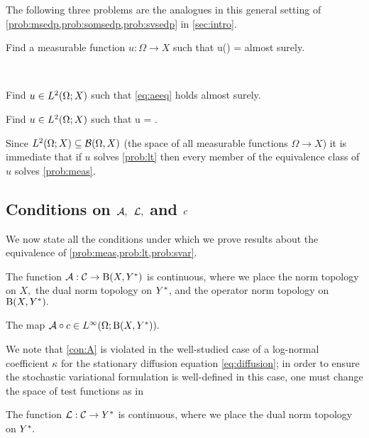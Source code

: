 The following three problems are the analogues in this general setting of \cref{prob:msedp,prob:somsedp,prob:svsedp} in \cref{sec:intro}.

\label{prob:meas}
Find a measurable function $u:\Omega \rightarrow X$ such that 
\beq\label{eq:aeeq}
\Acomega u(\omega) = \Lcomega \tin \Ys
\eeq
almost surely.
\eprobvar

\label{prob:lt}

\

Find $u \in \LtOX$ such that \eqref{eq:aeeq} holds almost surely.
\eprobvar

\label{prob:svar}
Find $u \in \LtOX$ such that
\beq\label{eq:stoeq}
\SAc u = \SLc \tin \LtOYas.
\eeq
\eprobvar

\label{rem:imm}
Since $\LtOX \subseteq \BorelOX$ (the space of all measurable functions $\Omega\rightarrow X$)
it is immediate that if $u$ solves \cref{prob:lt} then every member of the equivalence class of $u$ solves \cref{prob:meas}.
\ere

\subsection{Conditions on $\mathcal A,$ $\mathcal L,$ and $c$}\label{sec:cons}
We now state all the conditions under which we prove results about the equivalence of \cref{prob:meas,prob:lt,prob:svar}.


 \label{con:coeffstoform}
The function $\toform:\cC \rightarrow \homspace$ is continuous, where we place the norm topology on $X,$ the dual norm topology on $Y^{*}$, and the operator norm topology on $\homspace.$
\econvar

\label{con:A}
The map $\toform\circ\coeff \in \LiOhomspace.$
\econvar


We note that \cref{con:A} is violated in the well-studied case of a log-normal coefficient $\kappa$ for the stationary diffusion equation \eqref{eq:diffusion}; in order to ensure the stochastic variational formulation is well-defined in this case, one must change the space of test functions as in \cite{Gi:10,MuSt:11}

 \label{con:coeffstofunc}
The function $\mathcal L:\mathcal C \rightarrow Y^{*}$  is continuous, where we place the dual norm topology on $Y^{*}.$
\econvar

